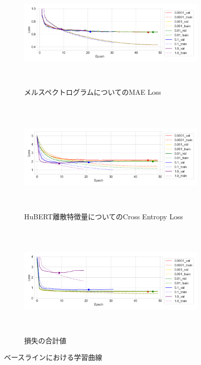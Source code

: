 \begin{figure}[bt]
    \centering
    \begin{subfigure}{\linewidth}
        \centering
        \includegraphics[height=55mm]{./figure/sec4/learning_curves/0/mel_loss.png}
        \caption{メルスペクトログラムについてのMAE Loss}
        \label{sec4:fig:learning_curve_baseline_val_mel_loss}
    \end{subfigure}
    \begin{subfigure}{\linewidth}
        \centering
        \includegraphics[height=55mm]{./figure/sec4/learning_curves/0/ssl_feature_cluster_loss.png}
        \caption{HuBERT離散特徴量についてのCross Entropy Loss}
        \label{sec4:fig:learning_curve_baseline_val_ssl_feature_cluster_loss}
    \end{subfigure}
    \begin{subfigure}{\linewidth}
        \centering
        \includegraphics[height=55mm]{./figure/sec4/learning_curves/0/total_loss.png}
        \caption{損失の合計値}
        \label{sec4:fig:learning_curve_baseline_val_total_loss}
    \end{subfigure}
    \caption{ベースラインにおける学習曲線}
    \label{sec4:fig:learning_curve_baseline_val_losses}
\end{figure}

